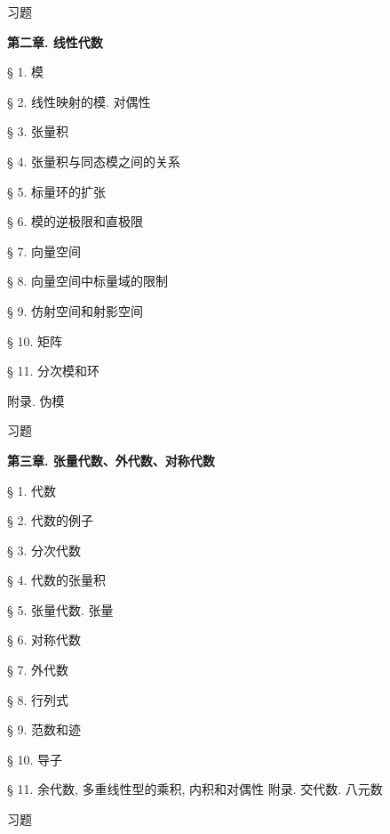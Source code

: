 习题

\textbf{第二章. 线性代数}

§ 1. 模

§ 2. 线性映射的模. 对偶性

§ 3. 张量积

§ 4. 张量积与同态模之间的关系

§ 5. 标量环的扩张

§ 6. 模的逆极限和直极限

§ 7. 向量空间

§ 8. 向量空间中标量域的限制

§ 9. 仿射空间和射影空间

§ 10. 矩阵

§ 11. 分次模和环

附录. 伪模

习题

\textbf{第三章. 张量代数、外代数、对称代数}

§ 1. 代数

§ 2. 代数的例子

§ 3. 分次代数

§ 4. 代数的张量积

§ 5. 张量代数. 张量

§ 6. 对称代数

§ 7. 外代数

§ 8. 行列式

§ 9. 范数和迹

§ 10. 导子

§ 11. 余代数, 多重线性型的乘积, 内积和对偶性 附录. 交代数. 八元数

习题
